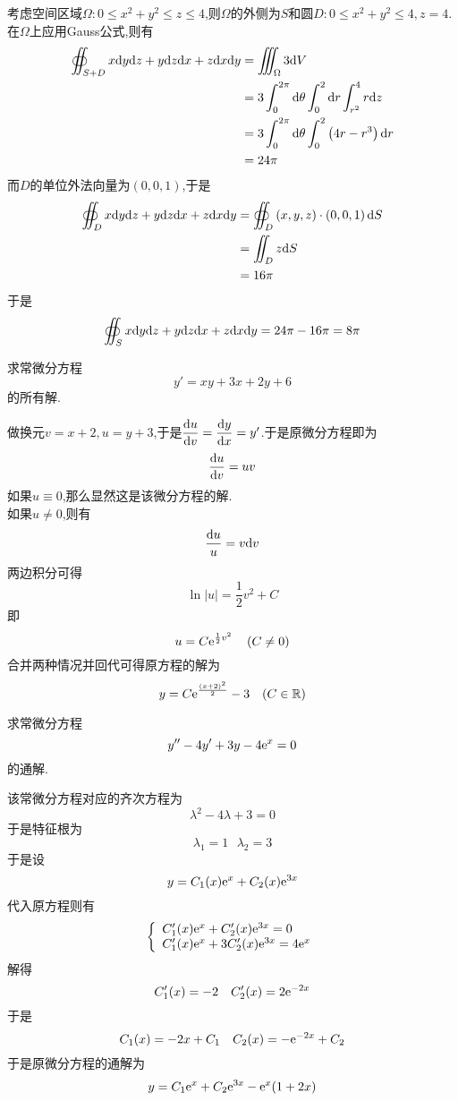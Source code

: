 \documentclass{ctexart}
\begin{document}
\begin{solution}
    考虑空间区域$\Omega:0\leqslant x^2+y^2\leqslant z\leqslant 4$,则$\Omega$的外侧为$S$和圆$D:0\leqslant x^2+y^2\leqslant 4,z=4$.\\
    在$\Omega$上应用Gauss公式,则有
    \[\begin{aligned}
        \oiint_{S+D}x\mathrm{d} y\mathrm{d} z+y\mathrm{d} z\mathrm{d} x+z\mathrm{d} x\mathrm{d} y
        &= \iiint_{\Omega}3\mathrm{d} V \\
        &= 3\int_0^{2\pi}\mathrm{d}\theta\int_0^2\mathrm{d} r\int_{r^2}^4r\mathrm{d} z \\
        &= 3\int_0^{2\pi}\mathrm{d}\theta\int_0^2\left(4r-r^3\right)\mathrm{d} r \\
        &= 24\pi
    \end{aligned}\]
    而$D$的单位外法向量为$(0,0,1)$,于是
    \[\begin{aligned}
        \oiint_Dx\mathrm{d} y\mathrm{d} z+y\mathrm{d} z\mathrm{d} x+z\mathrm{d} x\mathrm{d} y
        &= \oiint_D\left(x,y,z\right)\cdot\left(0,0,1\right)\mathrm{d} S \\
        &= \iint_Dz\mathrm{d} S \\
        &= 16\pi
    \end{aligned}\]
    于是
    \[\oiint_Sx\mathrm{d} y\mathrm{d} z+y\mathrm{d} z\mathrm{d} x+z\mathrm{d} x\mathrm{d} y=24\pi-16\pi=8\pi\]
\end{solution}
\begin{problem}[6.(10\songti{分})]
    求常微分方程
    \[y'=xy+3x+2y+6\]
    的所有解.
\end{problem}
\begin{solution}
    做换元$v=x+2,u=y+3$,于是$\dfrac{\mathrm{d} u}{\mathrm{d} v}=\dfrac{\mathrm{d} y}{\mathrm{d} x}=y'$.于是原微分方程即为
    \[\dfrac{\mathrm{d} u}{\mathrm{d} v}=uv\]
    如果$u\equiv0$,那么显然这是该微分方程的解.\\
    如果$u\neq0$,则有
    \[\dfrac{\mathrm{d} u}{u}=v\mathrm{d} v\]
    两边积分可得
    \[\ln\left|u\right|=\dfrac12v^2+C\]
    即
    \[u=C\e^{\frac12v^2}\ \ \ \left(C\neq0\right)\]
    合并两种情况并回代可得原方程的解为
    \[y=C\e^{\frac{(x+2)^2}{2}}-3\ \ \ (C\in\R)\]

\end{solution}
\begin{problem}[7.(15\songti{分})]
    求常微分方程
    \[y''-4y'+3y-4\mathrm{e}^x=0\]
    的通解.
\end{problem}
\begin{solution}
    该常微分方程对应的齐次方程为
    \[\lambda^2-4\lambda+3=0\]
    于是特征根为
    \[\lambda_1=1\ \ \ \lambda_2=3\]
    于是设
    \[y=C_1(x)\mathrm{e}^x+C_2(x)\mathrm{e}^{3x}\]
    代入原方程则有
    \[\left\{\begin{array}{l}
        C_1'(x)\mathrm{e}^x+C_2'(x)\mathrm{e}^{3x}=0\\
        C_1'(x)\mathrm{e}^x+3C_2'(x)\mathrm{e}^{3x}=4\mathrm{e}^x
    \end{array}\right.\]
    解得
    \[C_1'(x)=-2\ \ \ C_2'(x)=2\mathrm{e}^{-2x}\]
    于是
    \[C_1(x)=-2x+C_1\ \ \ C_2(x)=-\e^{-2x}+C_2\]
    于是原微分方程的通解为
    \[y=C_1\mathrm{e}^x+C_2\mathrm{e}^{3x}-\mathrm{e}^x(1+2x)\]
\end{solution}
\end{document}

